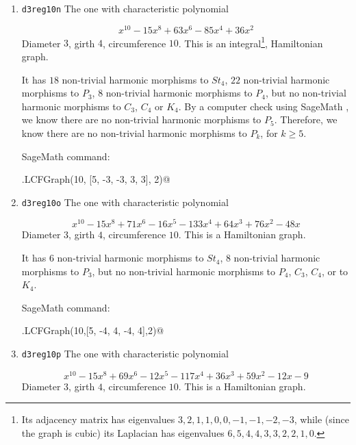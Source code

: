 \documentclass[12pt,letterpaper]{article}
\theoremstyle{definition}
\begin{document}
\begin{enumerate}
SageMath command:

\verb@graphs.LCFGraph(10,[2, 5, -2, 5, 5],2)@


\item
  {\tt d3reg10n}\newline
The one with %
characteristic polynomial  

\[
x^{10} - 15x^8 + 63x^6 - 85x^4 + 36x^2  
\]
Diameter $3$,
girth $4$,
circumference $10$.
This is an integral\footnote{Its adjacency matrix has
  eigenvalues $3, 2, 1, 1, 0, 0, -1, -1, -2, -3$, while
  (since the graph is cubic) its Laplacian has eigenvalues
  $6, 5, 4, 4, 3, 3, 2, 2, 1, 0$.},
Hamiltonian graph.

It has $18$ non-trivial harmonic morphisms to $St_4$,
$22$ non-trivial harmonic morphisms to $P_3$,
$8$ non-trivial harmonic morphisms to $P_4$,
but no non-trivial harmonic morphisms to $C_3$, $C_4$ or $K_4$.
By a computer check using SageMath , we know there
are no non-trivial harmonic morphisms to $P_5$.
Therefore, we know there
are no non-trivial harmonic morphisms to $P_k$, for $k\geq 5$.

SageMath command:

\verb@graphs.LCFGraph(10, [5, -3, -3, 3, 3], 2)@


\item
  {\tt d3reg10o}\newline
The one with %
characteristic polynomial  

\[
x^{10} - 15x^8 + 71x^6 - 16x^5 - 133x^4 + 64x^3 + 76x^2 - 48x  
\]
Diameter $3$,
girth $4$,
circumference $10$.
This is a Hamiltonian graph.

It has $6$ non-trivial harmonic morphisms to $St_4$,
$8$ non-trivial harmonic morphisms to $P_3$,
but no non-trivial harmonic morphisms to $P_4$, $C_3$, $C_4$, or to $K_4$.

SageMath command:

\verb@graphs.LCFGraph(10,[5, -4, 4, -4, 4],2)@


\item
  {\tt d3reg10p}\newline
The one with %
characteristic polynomial  

\[
x^{10} - 15x^8 + 69x^6 -12x^5 - 117x^4 +36x^3 + 59x^2 -12x - 9  
\]
Diameter $3$,
girth $4$,
circumference $10$.
This is a Hamiltonian graph.%


\end{enumerate}
\end{document}
